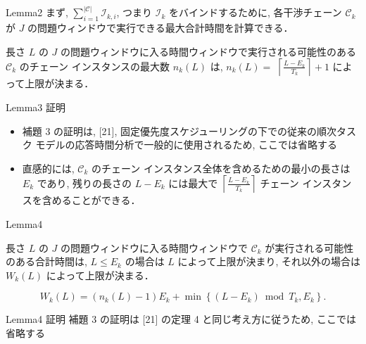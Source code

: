 \begin{frame}{Lemma2}
    まず, $\sum_{i=1}^{|\mathcal{C}|} \mathcal{I}_{k, i}$, つまり $\mathcal{I}_{k}$ をバインドするために, 各干渉チェーン $\mathcal{C}_{k}$ が $J$ の問題ウィンドウで実行できる最大合計時間を計算できる．

    \begin{lemma}[]
        長さ $L$ の $J$ の問題ウィンドウに入る時間ウィンドウで実行される可能性のある $\mathcal{C}_{k}$ のチェーン インスタンスの最大数 $n_{k}(L)$ は, $n_{k}(L)=$  $\left\lceil\frac{L-E_{k}}{T_{k}}\right\rceil+1$ によって上限が決まる．
    \end{lemma}
\end{frame}

\begin{frame}{Lemma3 証明}
    \begin{itemize}
        \item 補題 3 の証明は, [21], 固定優先度スケジューリングの下での従来の順次タスク モデルの応答時間分析で一般的に使用されるため, ここでは省略する
        \item 直感的には, $\mathcal{C}_{k}$ のチェーン インスタンス全体を含めるための最小の長さは $E_{k}$ であり, 残りの長さの $L-E_{k}$ には最大で $\left\lceil\frac{L-E_{k}}{T_{k}}\right\rceil$ チェーン インスタンスを含めることができる．
    \end{itemize}
\end{frame}

\begin{frame}{Lemma4}
    \begin{lemma}[]
        長さ $L$ の $J$ の問題ウィンドウに入る時間ウィンドウで $\mathcal{C}_{k}$ が実行される可能性のある合計時間は, $L \leq E_{k}$ の場合は $L$ によって上限が決まり, それ以外の場合は $W_{k}(L)$ によって上限が決まる．

        \begin{equation*}
            W_{k}(L)=\left(n_{k}(L)-1\right) E_{k}+\min \left\{\left(L-E_{k}\right) \bmod T_{k}, E_{k}\right\} .
        \end{equation*}
    \end{lemma}
\end{frame}

\begin{frame}{Lemma4 証明}
    補題 3 の証明は [21] の定理 4 と同じ考え方に従うため, ここでは省略する
\end{frame}

\begin{frame}{}
\end{frame}

